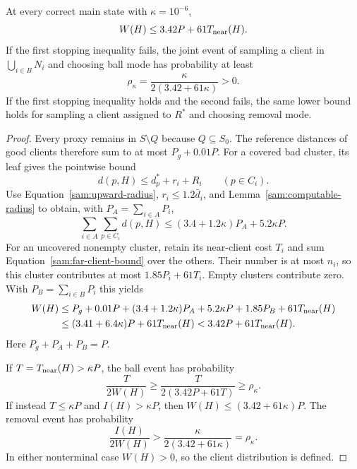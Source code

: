 \begin{lemma}\label{sam:sampling-mass}
At every correct main state with $\kappa=10^{-6}$,
\begin{equation}
 W(H)\le3.42P+61T_{\rm near}(H).
 \label{sam:weight-bound}
\end{equation}
If the first stopping inequality fails, the joint event of sampling a
client in $\bigcup_{i\in B}N_i$ and choosing ball mode has probability
at least
\begin{equation}
 \rho_\kappa=\frac{\kappa}{2(3.42+61\kappa)}>0.
 \label{sam:progress-constant}
\end{equation}
If the first stopping inequality holds and the second fails, the same
lower bound holds for sampling a client assigned to $R^*$ and choosing
removal mode.
\end{lemma}

\begin{proof}
Every proxy remains in $S\setminus Q$ because $Q\subseteq S_0$.
The reference distances of good clients therefore sum to at most
$P_g+0.01P$.  For a covered bad cluster, its leaf gives the pointwise
bound
\begin{equation}
 d(p,H)\le d_p^*+r_i+R_i\qquad(p\in C_i).
 \label{sam:covered-client-bound}
\end{equation}
Use Equation~\eqref{sam:upward-radius}, $r_i\le1.2\bar d_i$, and
Lemma~\ref{sam:computable-radius} to obtain, with $P_A=\sum_{i\in A}P_i$,
\[
 \sum_{i\in A}\sum_{p\in C_i}d(p,H)
 \le(3.4+1.2\kappa)P_A+5.2\kappa P.
\]
For an uncovered nonempty cluster, retain its near-client cost $T_i$
and sum Equation~\eqref{sam:far-client-bound} over the others.  Their
number is at most $n_i$, so this cluster contributes at most
$1.85P_i+61T_i$.  Empty clusters contribute zero.  With
$P_B=\sum_{i\in B}P_i$ this yields
\begin{align*}
 W(H)
 &\le P_g+0.01P+(3.4+1.2\kappa)P_A+5.2\kappa P
                         +1.85P_B+61T_{\rm near}(H)\\
 &\le(3.41+6.4\kappa)P+61T_{\rm near}(H)
 <3.42P+61T_{\rm near}(H).
\end{align*}
Here $P_g+P_A+P_B=P$.

If $T=T_{\rm near}(H)>\kappa P$, the ball event has probability
\[
 \frac{T}{2W(H)}\ge\frac{T}{2(3.42P+61T)}\ge\rho_\kappa.
\]
If instead $T\le\kappa P$ and $I(H)>\kappa P$, then
$W(H)\le(3.42+61\kappa)P$.  The removal event has probability
\[
 \frac{I(H)}{2W(H)}>\frac{\kappa}{2(3.42+61\kappa)}=\rho_\kappa.
\]
In either nonterminal case $W(H)>0$, so
the client distribution is defined.
\end{proof}

